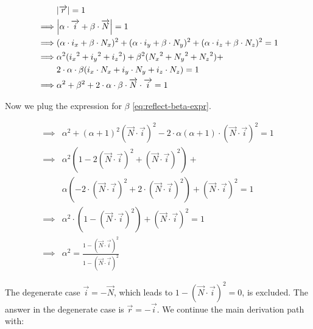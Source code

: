 \begin{equation} \begin{split}
& \abs{\overrightarrow{r}} = 1 \\
\implies& \abs{\alpha \cdot \overrightarrow{i} +
                \beta \cdot \overrightarrow{N}} = 1 \\
\implies& (\alpha \cdot i_x + \beta \cdot N_x)^2 +
          (\alpha \cdot i_y + \beta \cdot N_y)^2 +
          (\alpha \cdot i_z + \beta \cdot N_z)^2 = 1 \\
\implies& \alpha^2 ({i_x}^2 + {i_y}^2 + {i_z}^2) +
          \beta^2 ({N_x}^2 + {N_y}^2 + {N_z}^2) + \\
          &2 \cdot \alpha \cdot \beta 
          (i_x \cdot N_x + i_y \cdot N_y + i_z \cdot N_z) = 1 \\
\implies& \alpha^2 + \beta^2 + 2 \cdot \alpha \cdot \beta \cdot
          \overrightarrow{N} \cdot \overrightarrow{i} = 1
\end{split} \end{equation}

Now we plug the expression for $\beta$ \cref{eq:reflect-beta-expr}.

\begin{equation} \begin{split}
\implies& \alpha^2 + (\alpha + 1)^2
(\overrightarrow{N} \cdot \overrightarrow{i})^2
- 2 \cdot \alpha (\alpha + 1) \cdot
(\overrightarrow{N} \cdot \overrightarrow{i})^2 = 1 \\
\implies& \alpha^2 (1 - 2 (\overrightarrow{N} \cdot \overrightarrow{i})^2
+ (\overrightarrow{N} \cdot \overrightarrow{i})^2) + \\
& \alpha (-2\cdot (\overrightarrow{N} \cdot \overrightarrow{i})^2
        +2 \cdot (\overrightarrow{N} \cdot \overrightarrow{i})^2) +
(\overrightarrow{N} \cdot \overrightarrow{i})^2 = 1 \\
\implies& \alpha^2 \cdot (1 - (\overrightarrow{N} \cdot \overrightarrow{i})^2)
+ (\overrightarrow{N} \cdot \overrightarrow{i})^2 = 1 \\
\implies& \alpha^2 = \frac{1 - (\overrightarrow{N} \cdot \overrightarrow{i})^2}
                          {1 - (\overrightarrow{N} \cdot \overrightarrow{i})^2}
\end{split} \end{equation}

The degenerate case $\overrightarrow{i} = - \overrightarrow{N}$, which
leads to $1 - (\overrightarrow{N} \cdot \overrightarrow{i})^2 = 0$, is excluded.
The answer in the degenerate case is $\overrightarrow{r} = -
\overrightarrow{i}$. We continue the main derivation path with:

